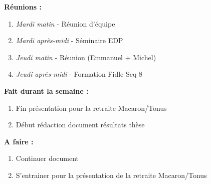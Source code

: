 \textbf{Réunions :}
\begin{enumerate}[label=\textbullet]
	\item \textit{Mardi matin} - Réunion d'équipe
	\item \textit{Mardi après-midi} - Séminaire EDP
	\item \textit{Jeudi matin} - Réunion (Emmanuel + Michel)
	\item \textit{Jeudi après-midi} - Formation Fidle Seq 8
\end{enumerate}
\textbf{Fait durant la semaine :}
\begin{enumerate}[label=\textbullet]
	\item Fin présentation pour la retraite Macaron/Tonus
	\item Début rédaction document résultats thèse
\end{enumerate}
\textbf{A faire :}
\begin{enumerate}[label=\textbullet]
	\item Continuer document
	\item S'entrainer pour la présentation de la retraite Macaron/Tonus
\end{enumerate}